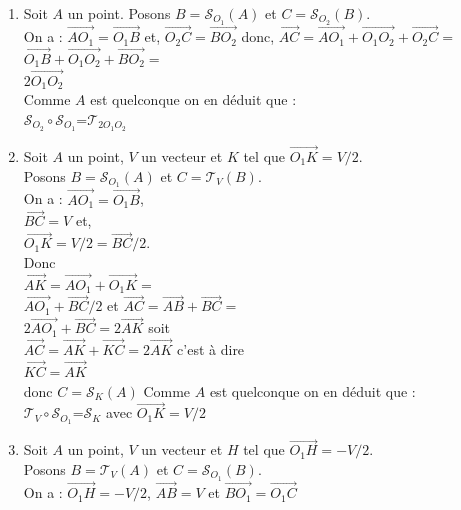 \documentclass[a4paper,11pt]{book}
\begin{document}
\begin{enumerate}
\item Soit $A$ un point. Posons $B=\mathcal S_{O_1}(A)$ et 
$C=\mathcal S_{O_2}(B)$.\\
On a :
$\overrightarrow {AO_1}=\overrightarrow {O_1B}$ et,
$\overrightarrow {O_2C}=\overrightarrow {BO_2}$ donc,
$\overrightarrow {AC}=\overrightarrow {AO_1}+\overrightarrow {O_1O_2}+
\overrightarrow {O_2C}=$\\
$\overrightarrow {O_1B}+\overrightarrow {O_1O_2}+\overrightarrow {BO_2}=$\\
$2\overrightarrow {O_1O_2}$\\
Comme $A$ est quelconque on en d\'eduit que :\\
$\mathcal S_{O_2} \circ \mathcal S_{O_1}$=$\mathcal T_{2O_1O_2}$

\item Soit $A$ un point, $V$ un vecteur et $K$ tel que 
$\overrightarrow {O_1K}=V/2$. \\
Posons  $B=\mathcal S_{O_1}(A)$ et 
$C=\mathcal T_V(B)$.\\
On a :
$\overrightarrow {AO_1}=\overrightarrow {O_1B}$,\\
$\overrightarrow {BC}=V$ et,\\
$\overrightarrow {O_1K}=V/2=\overrightarrow {BC}/2$.\\
Donc \\
$\overrightarrow {AK}=\overrightarrow {AO_1}+\overrightarrow {O_1K}=$\\
$\overrightarrow {AO_1}+\overrightarrow {BC}/2$ et
$\overrightarrow {AC}=\overrightarrow {AB}+\overrightarrow {BC}=$\\
$2\overrightarrow {AO_1}+\overrightarrow {BC}=2\overrightarrow {AK}$ soit\\
$\overrightarrow {AC}=\overrightarrow {AK}+\overrightarrow {KC}=2\overrightarrow {AK}$ c'est \`a dire\\
$\overrightarrow {KC}=\overrightarrow {AK}$\\
donc $C=\mathcal S_K(A)$ 
Comme $A$ est quelconque on en d\'eduit que :\\
$\mathcal T_{V} \circ \mathcal S_{O_1}$=$\mathcal S_{K}$ avec 
$\overrightarrow {O_1K}=V/2$
\item Soit $A$ un point, $V$ un vecteur et $H$ tel que 
$\overrightarrow {O_1H}=-V/2$. \\
Posons  $B=\mathcal T_V(A)$ et $C=\mathcal S_{O_1}(B)$.\\
On a :
$\overrightarrow {O_1H}=-V/2$,
$\overrightarrow {AB}=V$ et $\overrightarrow {BO_1}=\overrightarrow {O_1C}$\\

\end{enumerate}
\end{document}
